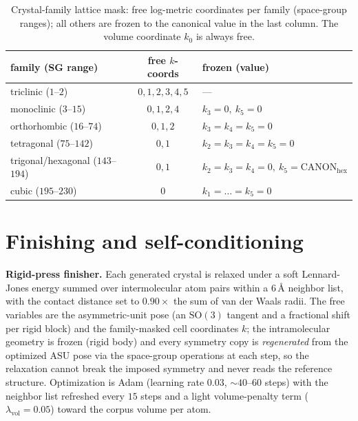 \documentclass[journal=acsodf,manuscript=article]{achemso}
\begin{document}
\begin{table}[h]\centering
\caption{Crystal-family lattice mask: free log-metric coordinates per family
(space-group ranges); all others are frozen to the canonical value in the last
column. The volume coordinate $k_0$ is always free.}
\label{sitab:mask}
\begin{tabular}{lcl}\toprule
family (SG range) & free $k$-coords & frozen (value) \\\midrule
triclinic ($1$--$2$)              & $0,1,2,3,4,5$ & --- \\
monoclinic ($3$--$15$)            & $0,1,2,4$     & $k_3{=}0,\ k_5{=}0$ \\
orthorhombic ($16$--$74$)         & $0,1,2$       & $k_3{=}k_4{=}k_5{=}0$ \\
tetragonal ($75$--$142$)          & $0,1$         & $k_2{=}k_3{=}k_4{=}k_5{=}0$ \\
trigonal/hexagonal ($143$--$194$) & $0,1$         & $k_2{=}k_3{=}k_4{=}0,\ k_5{=}\text{CANON}_{\mathrm{hex}}$ \\
cubic ($195$--$230$)              & $0$           & $k_1{=}\dots{=}k_5{=}0$ \\\bottomrule
\end{tabular}
\end{table}

\section{Finishing and self-conditioning}\label{sisec:finish}
\textbf{Rigid-press finisher.} Each generated crystal is relaxed under a soft
Lennard-Jones energy summed over intermolecular atom pairs within a $6\,\text{\AA}$
neighbor list, with the contact distance set to $0.90\times$ the sum of van der
Waals radii. The free variables are the asymmetric-unit pose (an $\mathrm{SO}(3)$
tangent and a fractional shift per rigid block) and the family-masked cell
coordinates $k$; the intramolecular geometry is frozen (rigid body) and every
symmetry copy is \emph{regenerated} from the optimized ASU pose via the space-group
operations at each step, so the relaxation cannot break the imposed symmetry and
never reads the reference structure. Optimization is Adam (learning rate $0.03$,
$\sim\!40$--$60$ steps) with the neighbor list refreshed every $15$ steps and a
light volume-penalty term ($\lambda_{\mathrm{vol}}=0.05$) toward the corpus volume
per atom.
\end{document}
